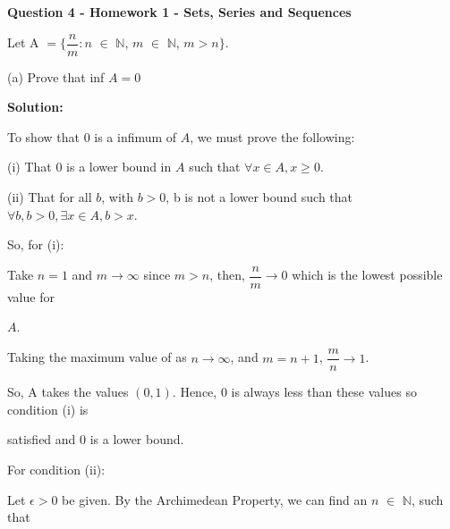 \documentclass{article}
\begin{document}
\large{\textbf{Question 4 - Homework 1 - Sets, Series and Sequences}
\vspace{5 mm}

Let A $= \{ \dfrac{n}{m} : n$ $\in$ $\mathbb{N}$, $m$ $\in$ $\mathbb{N}$, $m > n \}.$

\vspace{5mm}

(a) Prove that inf $A = 0$
\vspace{5mm}

\textbf{Solution:}

\vspace{5mm}

To show that $0$ is a infimum of $A$, we must prove the following:

\vspace{2mm}

(i) That $0$ is a lower bound in $A$ such that $\forall x \in A, x \geqslant 0$.

\vspace{2mm}

(ii) That for all $b$, with $b > 0$, b is not a lower bound such that $\forall b, b > 0, \exists x \in A, b > x$.

\vspace{4mm}

So, for (i):

\vspace{2mm}

Take $n = 1$ and $m \rightarrow \infty$ since $m > n$, then, $\dfrac{n}{m} \rightarrow 0$ which is the lowest possible value for 

$A$.

\vspace{2mm}

Taking the maximum value of as $n \rightarrow \infty$, and $m = n+1$, $\dfrac{m}{n} \rightarrow 1$.

\vspace{2mm}

So, A takes the values $(0, 1)$. Hence, 0 is always less than these values so condition (i) is 

\vspace{2mm}

satisfied and 0 is a lower bound. 

\vspace{5mm}

For condition (ii):

\vspace{2mm}

Let $\epsilon > 0$ be given. By the Archimedean Property, we can find an $n$ $\in$ $\mathbb{N}$, such that 

}
\end{document}
